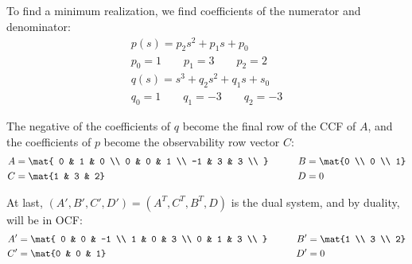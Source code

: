 \documentclass{homework}
\begin{document}
\subsection{}

To find a minimum realization, we find coefficients of the numerator
and denominator:
\begin{align*}
    p(s) = p_2 s^2 + p_1 s + p_0 \\
    p_0 = 1 \qquad p_1 = 3 \qquad p_2 = 2 \\
    q(s) = s^3 + q_2 s^2 + q_1 s + s_0 \\
    q_0 = 1 \qquad q_1 = -3 \qquad q_2 = -3
\end{align*}

The negative of the coefficients of $q$ become the final row of
the CCF of $A$, and the coefficients of $p$ become the observability
row vector $C$:
\begin{align*}
    A &= \mat{
        0 & 1 & 0 \\
        0 & 0 & 1 \\
        -1 & 3 & 3 \\
    } &\qquad B &= \mat{0 \\ 0 \\ 1} \\
    C &= \mat{1 & 3 & 2} &\qquad D &= 0
\end{align*}

At last, $(A', B', C', D') = (A^T, C^T, B^T, D)$ is the dual system,
and by duality, will be in OCF:
\begin{align*}
    A' &= \mat{
        0 & 0 & -1 \\
        1 & 0 & 3 \\
        0 & 1 & 3 \\
    } &\qquad B' &= \mat{1 \\ 3 \\ 2} \\
    C' &= \mat{0 & 0 & 1} &\qquad D' &= 0
\end{align*}
\end{document}
